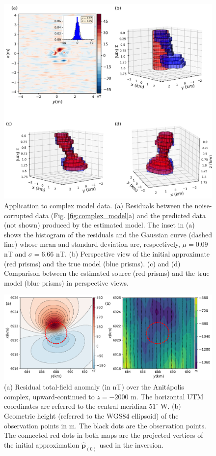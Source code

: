 \begin{figure}
    \centering
    \includegraphics[scale=.5]{figures/complex_results.png}
    \caption{Application to complex model data. (a) Residuals between the noise-corrupted data (Fig. \ref{fig:complex_model}a) and the predicted data (not shown) produced by the estimated model. The inset in (a) shows the histogram of the residuals and the Gaussian curve (dashed line) whose mean and standard deviation are, respectively, $\mu = 0.09$ nT and $\sigma=6.66$ nT. (b) Perspective view of the initial approximate (red prisms) and the true model (blue prisms). (c) and (d) Comparison between the estimated source (red prisms) and the true model (blue prisms) in perspective views. 
}
    \label{fig:complex_result}
\end{figure}


\begin{figure}
    \centering
    \includegraphics[scale=.5]{figures/real_updata.png}
    \caption{(a) Residual total-field anomaly (in nT) over the  
    Anit{\'a}polis complex, upward-continued to $z = -2000$ m. The horizontal UTM 
    coordinates are referred to the central meridian $ 51^\circ $ W. (b) Geometric 
    height (referred to the WGS84 ellipsoid) of the observation points in m. 
    The black dots are the observation points. The connected red dots in both maps 
    are the projected vertices of the initial approximation $\hat{\mathbf{p}}_{(0)}$ 
    used in the inversion.}
    \label{fig:real_data}
\end{figure}

